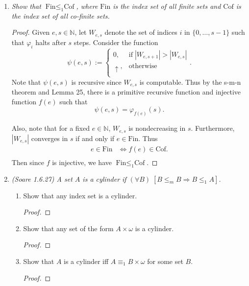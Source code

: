 \documentclass{article}
\begin{document}
\begin{enumerate}[label={\bf Q\arabic*:}]
  \item \it Show that $\text{Fin}\leq_1\text{Cof}$, where $\text{Fin}$ is
    the index set of all finite sets and $\text{Cof}$ is the index set of
    all co-finite sets.

    \begin{proof}
      Given $e,s\in\mathbb{N}$, let $W_{e,s}$ denote the set of indices $i$
      in $\{0,\ldots,s-1\}$ such that $\varphi_i$ halts after $s$ steps.
      Consider the function
      \begin{equation*}
        \psi(e,s) :=
        \begin{cases}
          0, &\text{if}\; |W_{e,s+1}|>|W_{e,s}|\\
          \uparrow, &\text{otherwise}\\
        \end{cases}.
      \end{equation*}
      Note that $\psi(e,s)$ is recursive since $W_{e,s}$ is computable.
      Thus by the s-m-n theorem and Lemma 25, there is a primitive
      recursive function and injective function $f(e)$ such that
      \[\psi(e,s)=\varphi_{f(e)}(s).\]

      Also, note that for a fixed $e\in\mathbb{N}$, $W_{e,s}$ is
      nondecreasing in $s$. Furthermore, $|W_{e,s}|$ converges in $s$ if
      and only if $e\in\text{Fin}$. Thus
      \begin{align*}
        e\in\text{Fin} &\Leftrightarrow f(e)\in\text{Cof}.\\
      \end{align*}
      Then since $f$ is injective, we have $\text{Fin}\leq_1\text{Cof}$.
    \end{proof}

  \item \it (Soare 1.6.27) A set $A$ is a cylinder if $(\forall B)\;
    [B\leq_m B \Rightarrow B\leq_1A]$.
    \begin{enumerate}[label={\bf (\roman*)}]
      \item Show that any index set is a cylinder.
        \begin{proof}
        \end{proof}

      \item Show that any set of the form $A\times\omega$ is a cylinder.
        \begin{proof}
        \end{proof}

      \item Show that $A$ is a cylinder iff $A\equiv_1B\times\omega$ for
        some set $B$.
        \begin{proof}
        \end{proof}
    \end{enumerate}
\end{enumerate}
\end{document}
